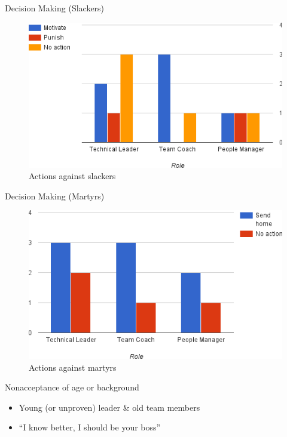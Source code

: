 \documentclass{beamer}
\begin{document}
\begin{frame}{Decision Making (Slackers) }
\begin{figure}[h]
  \centering
  \includegraphics[scale=0.6]{slacker.png}
  \caption{Actions against slackers}
  \label{fig:axbgrid}
\end{figure}
\end{frame}

\begin{frame}{Decision Making (Martyrs)}
\begin{figure}[h]
  \centering
  \includegraphics[scale=0.6]{marthyr.png}
  \caption{Actions against martyrs}
  \label{fig:axbgrid}
\end{figure}
\end{frame}
\begin{frame}{Nonacceptance of age or background}
\begin{itemize}
\item Young (or unproven) leader \& old team members
\item ``I know better, I should be your boss''
\end{itemize}
\end{frame}
\end{document}
